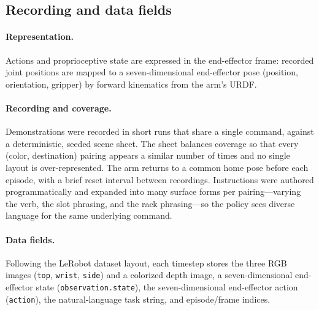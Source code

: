 \documentclass[11pt]{article}
\begin{document}
\subsection{Recording and data fields}
\paragraph{Representation.}
Actions and proprioceptive state are expressed in the end-effector frame: recorded
joint positions are mapped to a seven-dimensional end-effector pose (position,
orientation, gripper) by forward kinematics from the arm's URDF.

\paragraph{Recording and coverage.}
Demonstrations were recorded in short runs that share a single command, against a
deterministic, seeded scene sheet. The sheet balances coverage so that every
(color, destination) pairing appears a similar number of times and no single layout
is over-represented. The arm returns to a common home pose before each episode, with
a brief reset interval between recordings. Instructions were authored
programmatically and expanded into many surface forms per pairing---varying the verb,
the slot phrasing, and the rack phrasing---so the policy sees diverse language for the
same underlying command.

\paragraph{Data fields.}
Following the LeRobot dataset layout, each timestep stores the three RGB images
(\texttt{top}, \texttt{wrist}, \texttt{side}) and a colorized depth image, a
seven-dimensional end-effector state (\texttt{observation.state}), the
seven-dimensional end-effector action (\texttt{action}), the natural-language task
string, and episode/frame indices.
\end{document}
